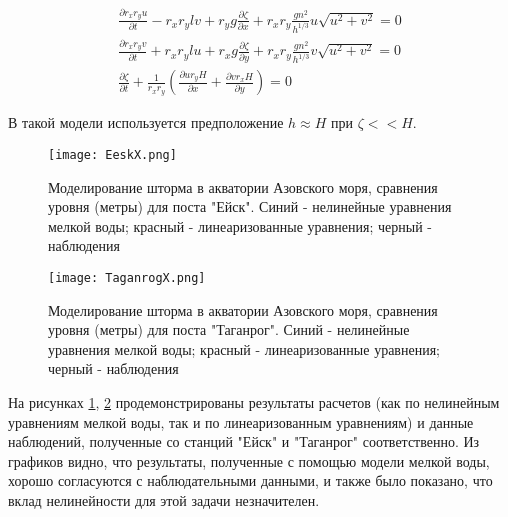 \begin{equation} \label{eq:1linear} 
	\begin{array}{c} 
	\displaystyle{\frac{\partial r_{x} r_{y} u}{\partial t} - r_{x} r_{y} l v + r_{y} g\frac{\partial \zeta }{\partial x} + r_x r_y \frac{g n^2}{h^{1/3}} u \sqrt{u^2 + v^2}= 0} \\ 
	
	\displaystyle{\frac{\partial r_{x} r_{y} v}{\partial t} + r_{x} r_{y} l u  +r_{x} g\frac{\partial \zeta }{\partial y} + r_x r_y \frac{g n^2}{h^{1/3}} v \sqrt{u^2 + v^2}= 0} \\ 
	
	\displaystyle{\frac{\partial \zeta}{\partial t} +\frac{1}{r_{x} r_{y} } \left(\frac{\partial u r_{y} H}{\partial x} +\frac{\partial v r_{x} H}{\partial y} \right)= 0} 
	\end{array} 
\end{equation}
	
В такой модели используется предположение $h \approx H$ при $\zeta << H$.

\begin{figure}[htb!]
	\center
	\texttt{[image: EeskX.png]}
	\caption{Моделирование шторма в акватории Азовского моря, сравнения уровня (метры) для поста "Ейск". 
		 Синий - нелинейные уравнения мелкой воды; красный - линеаризованные уравнения; черный - наблюдения}
	\label{fig:AS_Eesk}
\end{figure}
	
\begin{figure}[htb!]
	\center
	\texttt{[image: TaganrogX.png]}
	\caption{Моделирование шторма в акватории Азовского моря, сравнения уровня (метры) для поста "Таганрог". 
		 Синий - нелинейные уравнения мелкой воды; красный - линеаризованные уравнения; черный - наблюдения}
	\label{fig:AS_Taganrog}
\end{figure}

На рисунках \ref{fig:AS_Eesk}, \ref{fig:AS_Taganrog} продемонстрированы результаты расчетов (как по нелинейным уравнениям мелкой воды, так и по линеаризованным уравнениям) и данные наблюдений, полученные со станций "Ейск" и  "Таганрог" соответственно.
Из графиков видно, 
что результаты, полученные с помощью модели мелкой воды, хорошо согласуются с наблюдательными данными, и также было показано, что вклад нелинейности для этой задачи незначителен.

\FloatBarrier